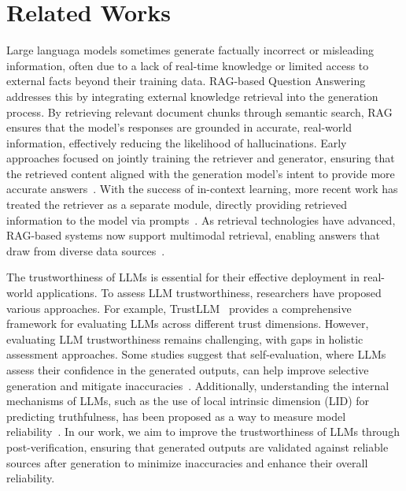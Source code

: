 \section{Related Works}
\label{sec:related}

%
Large languaga models sometimes generate factually incorrect or misleading information, often due to a lack of real-time knowledge or limited access to external facts beyond their training data.
RAG-based Question Answering addresses this by integrating external knowledge retrieval into the generation process. By retrieving relevant document chunks through semantic search, RAG ensures that the model’s responses are grounded in accurate, real-world information, effectively reducing the likelihood of hallucinations.
Early approaches focused on jointly training the retriever and generator, ensuring that the retrieved content aligned with the generation model’s intent to provide more accurate answers~\cite{izacard2023atlas}. With the success of in-context learning, more recent work has treated the retriever as a separate module, directly providing retrieved information to the model via prompts~\cite{wang2023knowledgptenhancinglargelanguage}.
As retrieval technologies have advanced, RAG-based systems now support multimodal retrieval, enabling answers that draw from diverse data sources~\cite{chen2021open, chen-etal-2022-murag, luo-etal-2023-unifying}. 


%
The trustworthiness of LLMs is essential for their effective deployment in real-world applications. To assess LLM trustworthiness, researchers have proposed various approaches. For example, TrustLLM~\cite{huang2024trustllmtrustworthinesslargelanguage} provides a comprehensive framework for evaluating LLMs across different trust dimensions.
However, evaluating LLM trustworthiness remains challenging, with gaps in holistic assessment approaches. Some studies suggest that self-evaluation, where LLMs assess their confidence in the generated outputs, can help improve selective generation and mitigate inaccuracies~\cite{Ren2023SelfEvaluationIS}. Additionally, understanding the internal mechanisms of LLMs, such as the use of local intrinsic dimension (LID) for predicting truthfulness, has been proposed as a way to measure model reliability~\cite{Yin2024CharacterizingTI}.
In our work, we aim to improve the trustworthiness of LLMs through post-verification, ensuring that generated outputs are validated against reliable sources after generation to minimize inaccuracies and enhance their overall reliability.